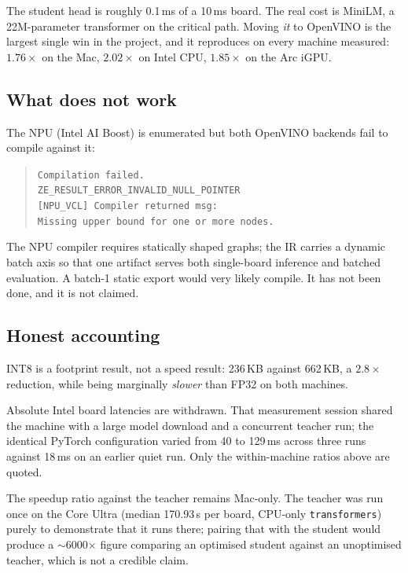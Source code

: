 \documentclass[11pt,a4paper]{article}
\newcommand{\code}[1]{\texttt{\small #1}}
\begin{document}
The student head is roughly 0.1\,ms of a 10\,ms board. The real cost is MiniLM, a
22M-parameter transformer on the critical path. Moving \emph{it} to OpenVINO is the
largest single win in the project, and it reproduces on every machine measured:
$1.76\times$ on the Mac, $2.02\times$ on Intel CPU, $1.85\times$ on the Arc iGPU.

\subsection{What does not work}

The NPU (Intel AI Boost) is enumerated but both OpenVINO backends fail to compile
against it:

\begin{quote}
\footnotesize\code{Compilation failed.}\\
\code{ZE\_RESULT\_ERROR\_INVALID\_NULL\_POINTER}\\
\code{[NPU\_VCL] Compiler returned msg:}\\
\code{Missing upper bound for one or more nodes.}
\end{quote}

The NPU compiler requires statically shaped graphs; the IR carries a dynamic batch axis
so that one artifact serves both single-board inference and batched evaluation. A
batch-1 static export would very likely compile. It has not been done, and it is not
claimed.

\subsection{Honest accounting}

INT8 is a footprint result, not a speed result: 236\,KB against 662\,KB, a $2.8\times$
reduction, while being marginally \emph{slower} than FP32 on both machines.

Absolute Intel board latencies are withdrawn. That measurement session shared the machine
with a large model download and a concurrent teacher run; the identical PyTorch
configuration varied from 40 to 129\,ms across three runs against 18\,ms on an earlier
quiet run. Only the within-machine ratios above are quoted.

The speedup ratio against the teacher remains Mac-only. The teacher was run once on the
Core Ultra (median 170.93\,s per board, CPU-only \code{transformers}) purely to
demonstrate that it runs there; pairing that with the student would produce a
$\sim$6000$\times$ figure comparing an optimised student against an unoptimised teacher,
which is not a credible claim.
\end{document}
